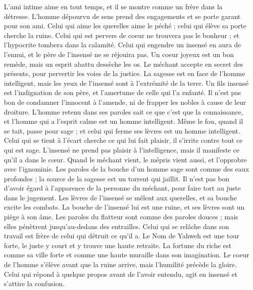 \begin{multicols}{2}
L'ami intime aime en tout temps, et il se montre comme un frère dans la détresse.
L’homme dépourvu de sens prend des engagements et se porte garant pour son ami.
Celui qui aime les querelles aime le péché ; celui qui élève sa porte cherche la ruine.
Celui qui est pervers de coeur ne trouvera pas le bonheur ; et l'hypocrite tombera dans la calamité.
Celui qui engendre un insensé en aura de l'ennui, et le père de l’insensé ne se réjouira pas.
Un coeur joyeux est un bon remède, mais un esprit abattu dessèche les os.
Le méchant accepte en secret des présents, pour pervertir les voies de la justice.
La sagesse est en face de l'homme intelligent, mais les yeux de l’insensé sont à l’extrémité de la terre.
Un fils insensé est l'indignation de son père, et l'amertume de celle qui l'a enfanté.
Il n'est pas bon de condamner l'innocent à l'amende, ni de frapper les nobles à cause de leur droiture.
L'homme retenu dans ses paroles sait ce que c'est que la connaissance, et l'homme qui a l’esprit calme est un homme intelligent.
Même le fou, quand il se tait, passe pour sage ; et celui qui ferme ses lèvres est un homme intelligent.
\VerseOne{}Celui qui se tient à l’écart cherche ce qui lui fait plaisir, il s’irrite contre tout ce qui est sage.
L’insensé ne prend pas plaisir à l'intelligence, mais il manifeste ce qu’il a dans le cœur.
Quand le méchant vient, le mépris vient aussi, et l’opprobre avec l'ignominie.
Les paroles de la bouche d'un homme sage sont comme des eaux profondes ; la source de la sagesse est un torrent qui jaillit.
Il n'est pas bon d'avoir égard à l'apparence de la personne du méchant, pour faire tort au juste dans le jugement.
Les lèvres de l’insensé se mêlent aux querelles, et sa bouche excite les combats.
La bouche de l’insensé lui est une ruine, et ses lèvres sont un piège à son âme.
Les paroles du flatteur sont comme des paroles douces ; mais elles pénètrent jusqu'au-dedans des entrailles.
Celui qui se relâche dans son travail est frère de celui qui détruit ce qu'il a.
Le Nom de Yahweh est une tour forte, le juste y court et y trouve une haute retraite.
La fortune du riche est comme sa ville forte et comme une haute muraille dans son imagination.
Le coeur de l'homme s'élève avant que la ruine arrive, mais l'humilité précède la gloire.
Celui qui répond à quelque propos avant de l'avoir entendu, agit en insensé et s’attire la confusion.

\end{multicols}
